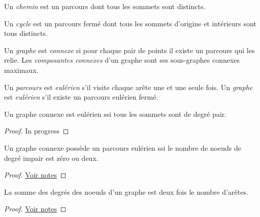 \begin{mydef}
  Un \emph{chemin} est un parcours dont tous les sommets sont distincts.
\end{mydef}

\begin{mydef}
  Un \emph{cycle} est un parcours fermé dont tous les sommets d'origine et intérieurs sont tous distincts.
\end{mydef}

\begin{mydef}
  Un \emph{graphe} est \emph{connexe} si pour chaque pair de points il existe un parcours qui les relie. Les \emph{composantes connexes} d'un graphe sont ses sous-graphes connexes maximaux.
\end{mydef}

\begin{mydef}
  Un \emph{parcours} est \emph{eulérien} s'il visite chaque arête une et une seule fois. Un \emph{graphe} est \emph{eulérien} s'il existe un parcours eulérien fermé.
\end{mydef}

\begin{mytheo} 
  Un graphe connexe est eulérien ssi tous les sommets sont de degré pair.
  \begin{proof}
     In progress
  \end{proof}
\end{mytheo}

\begin{mytheo} 
  Un graphe connexe possède un parcours eulérien ssi le nombre de noeuds de degré impair est zéro ou deux.
  \begin{proof}
     \href{https://dl.dropboxusercontent.com/u/44092863/Graph_Theory_Romain_Capron.pdf}{Voir notes} \addTODO
  \end{proof}
\end{mytheo}

\begin{mytheo} 
  La somme des degrés des noeuds d’un graphe est deux fois le nombre d’arêtes.
  \begin{proof}
     \href{https://dl.dropboxusercontent.com/u/44092863/Graph_Theory_Romain_Capron.pdf}{Voir notes} \addTODO
  \end{proof}
\end{mytheo}

